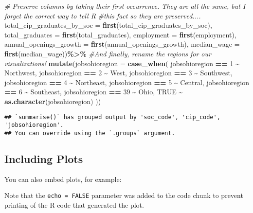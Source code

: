 \documentclass[
]{article}
\newenvironment{Shaded}{\begin{snugshade}}{\end{snugshade}}
\newcommand{\AttributeTok}[1]{\textcolor[rgb]{0.13,0.29,0.53}{#1}}
\newcommand{\CommentTok}[1]{\textcolor[rgb]{0.56,0.35,0.01}{\textit{#1}}}
\newcommand{\ConstantTok}[1]{\textcolor[rgb]{0.56,0.35,0.01}{#1}}
\newcommand{\FunctionTok}[1]{\textcolor[rgb]{0.13,0.29,0.53}{\textbf{#1}}}
\newcommand{\NormalTok}[1]{#1}
\newcommand{\SpecialCharTok}[1]{\textcolor[rgb]{0.81,0.36,0.00}{\textbf{#1}}}
\newcommand{\StringTok}[1]{\textcolor[rgb]{0.31,0.60,0.02}{#1}}
\begin{document}
\begin{Shaded}
\begin{Highlighting}[]
    \CommentTok{\# Preserve columns by taking their first occurrence. They are all the same, but I forget the correct way to tell R }
    \CommentTok{\#this fact so they are preserved....}
    \AttributeTok{total\_cip\_graduates\_by\_soc =} \FunctionTok{first}\NormalTok{(total\_cip\_graduates\_by\_soc),}
    \AttributeTok{total\_graduates =} \FunctionTok{first}\NormalTok{(total\_graduates),}
    \AttributeTok{employment =} \FunctionTok{first}\NormalTok{(employment),}
    \AttributeTok{annual\_openings\_growth =} \FunctionTok{first}\NormalTok{(annual\_openings\_growth),}
    \AttributeTok{median\_wage =} \FunctionTok{first}\NormalTok{(median\_wage))}\SpecialCharTok{\%\textgreater{}\%}
  \CommentTok{\#And finally, rename the regions for our visualizations!}
  \FunctionTok{mutate}\NormalTok{(}\AttributeTok{jobsohioregion =} \FunctionTok{case\_when}\NormalTok{(}
\NormalTok{    jobsohioregion }\SpecialCharTok{==} \StringTok{\textquotesingle{}1\textquotesingle{}} \SpecialCharTok{\textasciitilde{}} \StringTok{\textquotesingle{}Northwest\textquotesingle{}}\NormalTok{,}
\NormalTok{    jobsohioregion }\SpecialCharTok{==} \StringTok{\textquotesingle{}2\textquotesingle{}} \SpecialCharTok{\textasciitilde{}} \StringTok{\textquotesingle{}West\textquotesingle{}}\NormalTok{,}
\NormalTok{    jobsohioregion }\SpecialCharTok{==} \StringTok{\textquotesingle{}3\textquotesingle{}} \SpecialCharTok{\textasciitilde{}} \StringTok{\textquotesingle{}Southwest\textquotesingle{}}\NormalTok{,}
\NormalTok{    jobsohioregion }\SpecialCharTok{==} \StringTok{\textquotesingle{}4\textquotesingle{}} \SpecialCharTok{\textasciitilde{}} \StringTok{\textquotesingle{}Northeast\textquotesingle{}}\NormalTok{,}
\NormalTok{    jobsohioregion }\SpecialCharTok{==} \StringTok{\textquotesingle{}5\textquotesingle{}} \SpecialCharTok{\textasciitilde{}} \StringTok{\textquotesingle{}Central\textquotesingle{}}\NormalTok{,}
\NormalTok{    jobsohioregion }\SpecialCharTok{==} \StringTok{\textquotesingle{}6\textquotesingle{}} \SpecialCharTok{\textasciitilde{}} \StringTok{\textquotesingle{}Southeast\textquotesingle{}}\NormalTok{,}
\NormalTok{    jobsohioregion }\SpecialCharTok{==} \StringTok{\textquotesingle{}39\textquotesingle{}} \SpecialCharTok{\textasciitilde{}} \StringTok{\textquotesingle{}Ohio\textquotesingle{}}\NormalTok{,  }
    \ConstantTok{TRUE} \SpecialCharTok{\textasciitilde{}} \FunctionTok{as.character}\NormalTok{(jobsohioregion)}
\NormalTok{  ))}
\end{Highlighting}
\end{Shaded}

\begin{verbatim}
## `summarise()` has grouped output by 'soc_code', 'cip_code', 'jobsohioregion'.
## You can override using the `.groups` argument.
\end{verbatim}

\subsection{Including Plots}\label{including-plots}

You can also embed plots, for example:

Note that the \texttt{echo\ =\ FALSE} parameter was added to the code
chunk to prevent printing of the R code that generated the plot.
\end{document}
